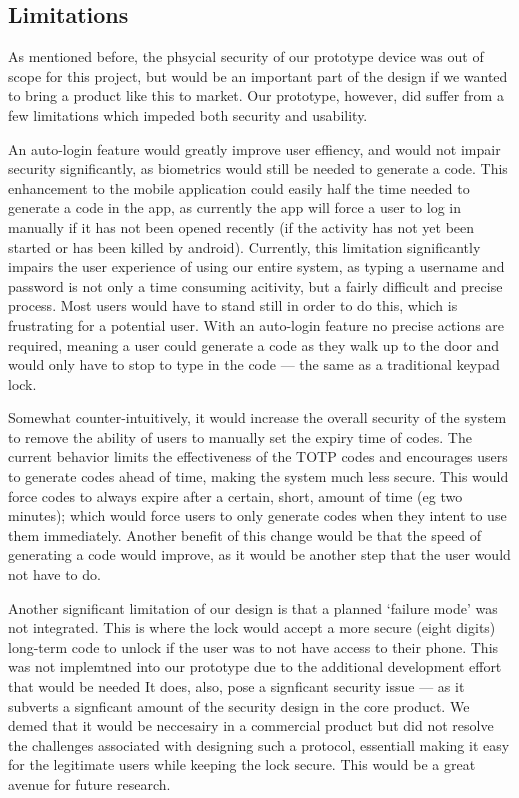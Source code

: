 \documentclass[conference]{IEEEtran}
\begin{document}
\subsection{Limitations}
As mentioned before, the phsycial security of our prototype device was out of scope for this project, but would be an important part of the design if we wanted to bring a product like this to market.
Our prototype, however, did suffer from a few limitations which impeded both security and usability.

An auto-login feature would greatly improve user effiency, and would not impair security significantly, as biometrics would still be needed to generate a code.
This enhancement to the mobile application could easily half the time needed to generate a code in the app, as currently the app will force a user to log in manually if it has not been opened recently (if the activity has not yet been started or has been killed by android).
Currently, this limitation significantly impairs the user experience of using our entire system, as typing a username and password is not only a time consuming acitivity, but a fairly difficult and precise process.
Most users would have to stand still in order to do this, which is frustrating for a potential user.
With an auto-login feature no precise actions are required, meaning a user could generate a code as they walk up to the door and would only have to stop to type in the code --- the same as a traditional keypad lock.

Somewhat counter-intuitively, it would increase the overall security of the system to remove the ability of users to manually set the expiry time of codes.
The current behavior limits the effectiveness of the TOTP codes and encourages users to generate codes ahead of time, making the system much less secure.
This would force codes to always expire after a certain, short, amount of time (eg two minutes); which would force users to only generate codes when they intent to use them immediately.
Another benefit of this change would be that the speed of generating a code would improve, as it would be another step that the user would not have to do.

Another significant limitation of our design is that a planned `failure mode' was not integrated. This is where the lock would accept a more secure (eight digits) long-term code to unlock if the user was to not have access to their phone.
This was not implemtned into our prototype due to the additional development effort that would be needed
It does, also, pose a signficant security issue --- as it subverts a signficant amount of the security design in the core product.
We demed that it would be neccesairy in a commercial product but did not resolve the challenges associated with designing such a protocol, essentiall making it easy for the legitimate users while keeping the lock secure.
This would be a great avenue for future research.
\end{document}
